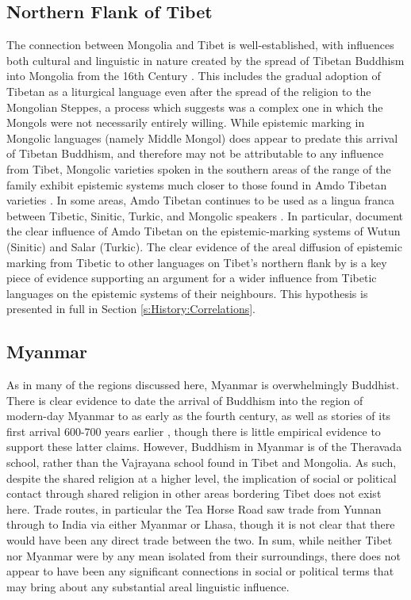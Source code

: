 \subsection{Northern Flank of Tibet}\label{ss:History:Amdo}
The connection between Mongolia and Tibet is well-established, with influences both cultural and linguistic in nature created by the spread of Tibetan Buddhism into Mongolia from the 16th Century \cite{Elverskog2007}. This includes the gradual adoption of Tibetan as a liturgical language even after the spread of the religion to the Mongolian Steppes, a process which  suggests was a complex one in which the Mongols were not necessarily entirely willing. While epistemic marking in Mongolic languages (namely Middle Mongol) does appear to predate this arrival of Tibetan Buddhism, and therefore may not be attributable to any influence from Tibet, Mongolic varieties spoken in the southern areas of the range of the family exhibit epistemic systems much closer to those found in Amdo Tibetan varieties \cite{Brosig2018}. In some areas, Amdo Tibetan continues to be used as a lingua franca between Tibetic, Sinitic, Turkic, and Mongolic speakers \cite{Sandman2016}. In particular,  document the clear influence of Amdo Tibetan on the epistemic-marking systems of Wutun (Sinitic) and Salar (Turkic). The clear evidence of the areal diffusion of epistemic marking from Tibetic to other languages on Tibet's northern flank by  is a key piece of evidence supporting an argument for a wider influence from Tibetic languages on the epistemic systems of their neighbours. This hypothesis is presented in full in Section \ref{s:History:Correlations}.

\subsection{Myanmar}
As in many of the regions discussed here, Myanmar is overwhelmingly Buddhist. There is clear evidence to date the arrival of Buddhism into the region of modern-day Myanmar to as early as the fourth century, as well as stories of its first arrival 600-700 years earlier \cite{Bretfeld2019}, though there is little empirical evidence to support these latter claims. However, Buddhism in Myanmar is of the Theravada school, rather than the Vajrayana school found in Tibet and Mongolia. As such, despite the shared religion at a higher level, the implication of social or political contact through shared religion in other areas bordering Tibet does not exist here.
Trade routes, in particular the Tea Horse Road \cite{Sigley2020} saw trade from Yunnan through to India via either Myanmar or Lhasa, though it is not clear that there would have been any direct trade between the two. In sum, while neither Tibet nor Myanmar were by any mean isolated from their surroundings, there does not appear to have been any significant connections in social or political terms that may bring about any substantial areal linguistic influence.

